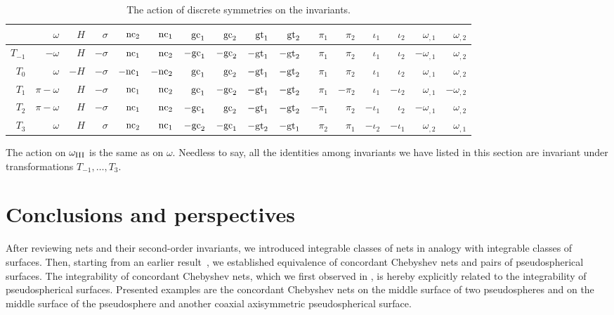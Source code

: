 \documentclass[pdftex]{sigma}
\def\nc#1{{\mathop{\rm nc}}_{#1}}
\def\gc#1{{\mathop{\rm gc}}_{#1}}
\def\gtor#1{{{\rm gt}}_{#1}}
\def\omegaIII{\omega_{\hbox{\sc iii}}}
\def\1{{-1}}
\numberwithin{equation}{section}
\begin{document}
\begin{table}[!ht]\centering\renewcommand{\arraystretch}{1.2}\setlength{\tabcolsep}{3.5pt}

\begin{tabular}{r|rrrrrrrrrrrrrrr}
     &  $\omega$    &  $H$ &  $\sigma$ &  $\nc2$ &  $\nc1$ &  $\gc1$ &  $\gc2$ &  $\gtor1$ &  $\gtor2$ &  $\pi_1$ &  $\pi_2$ &  $\iota_1$ &  $\iota_2$  & $\omega_{,1}$ &  $\omega_{,2}$  \\
\hline
 $T_\1$& $-\omega$    &  $H$ & $-\sigma$ &  $\nc1$ &  $\nc2$ & $-\gc1$ & $-\gc2$ & $-\gtor1$ & $-\gtor2$ &  $\pi_1$ &   $\pi_2$ & $\iota_1$ &  $\iota_2$ & $-\omega_{,1}$ &  $\omega_{,2}$ \\
 $T_0$ &  $\omega$    & $-H$ & $-\sigma$ & $-\nc1$ & $-\nc2$ &  $\gc1$ &  $\gc2$ & $-\gtor1$ & $-\gtor2$ &  $\pi_1$ &   $\pi_2$ &  $\iota_1$ &  $\iota_2$   & $\omega_{,1}$ &  $\omega_{,2}$ \\
 $T_1$ & $\pi - \omega$ & $ H$ & $-\sigma$ &  $\nc1$ &  $\nc2$ &  $\gc1$ & $-\gc2$ & $-\gtor1$ & $-\gtor2$ &  $\pi_1$ & $-\pi_2$ & $\iota_1$ &  $-\iota_2$  & $\omega_{,1}$ & $-\omega_{,2}$  \\
 $T_2$ & $\pi - \omega$ &  $H$ & $-\sigma$ &  $\nc1$ &  $\nc2$ & $-\gc1$ &  $\gc2$ & $-\gtor1$ & $-\gtor2$ & $-\pi_1$ &  $\pi_2$ &  $-\iota_1$ &  $\iota_2$ & $-\omega_{,1}$ &  $\omega_{,2}$ \\
 $T_3$ &  $\omega$    &  $H$ &  $\sigma$ &  $\nc2$ &  $\nc1$ & $-\gc2$ & $-\gc1$ & $-\gtor2$ & $-\gtor1$ &  $\pi_2$ &  $\pi_1$ &   $-\iota_2$ &  $-\iota_1$   & $\omega_{,2}$ &  $\omega_{,1}$
\end{tabular}
\caption{The action of discrete symmetries on the invariants.}
\label{tab:Ts:inv}
\end{table}

The action on $\omegaIII$ is the same as on $\omega$.
Needless to say, all the identities among invariants we have listed in this section
are invariant under transformations $T_{-1}, \dots, T_3$.






\section*{Conclusions and perspectives}



After reviewing nets and their second-order invariants,
we  introduced integrable classes of nets in analogy with
integrable classes of surfaces.
Then, starting from an earlier result~\cite{K-M}, we established equivalence of
concordant Chebyshev nets and pairs of pseudospherical surfaces.
The integrability of concordant Chebyshev nets, which we first observed
in \cite{K-M}, is hereby explicitly related to the integrability of pseudospherical
surfaces.
Presented examples are the concordant Chebyshev nets on the middle surface of
two pseudospheres and on the middle surface of the pseudosphere and another coaxial
axisymmetric pseudospherical surface.
\end{document}
